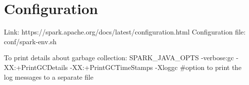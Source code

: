 \chapter{Configuration}
Link: https://spark.apache.org/docs/latest/configuration.html
Configuration file: conf/spark-env.sh

To print details about garbage collection:
SPARK_JAVA_OPTS
-verbose:gc
-XX:+PrintGCDetails -XX:+PrintGCTimeStamps
-Xloggc #option to print the log messages to a separate file